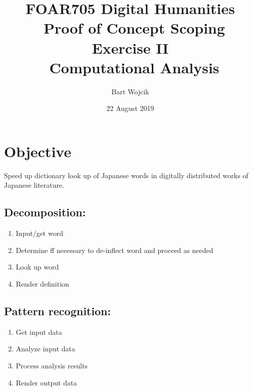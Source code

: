 \documentclass{article}
\title{FOAR705 Digital Humanities \\\ Proof of Concept Scoping Exercise II \\\  Computational Analysis}
\author{Bart Wojcik}
\date{22 August 2019}
\begin{document}
\maketitle

\section{Objective}
Speed up dictionary look up of Japanese words in digitally distributed works of Japanese literature.

\subsection{Decomposition:}
\begin{enumerate}
    \item Input/get word
    \item Determine ff necessary to de-inflect word and proceed as needed
    \item Look up word
    \item Render definition 
\end{enumerate}

\subsection{Pattern recognition:}
\begin{enumerate}
    \item Get input data    
    \item Analyze input data
    \item Process analysis results
    \item Render output data
\end{enumerate}
\end{document}
